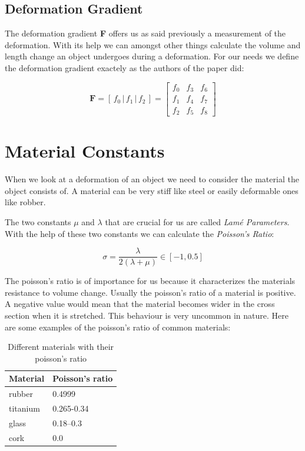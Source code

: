 

\subsection{Deformation Gradient}
The deformation gradient \textbf{F} offers us as said previously a measurement of the deformation. With its help we can amongst other things calculate the volume and length change an object undergoes during a deformation. For our needs we define the deformation gradient exactely as the authors of the paper \cite{Smith:2018:SNF:3191713.3180491} did:

\[
\textbf{F} = \left[ \,f_0\, \bigg| \,f_1\, \bigg| \,f_2\, \right] = \begin{bmatrix} f_0 & f_3 & f_6 \\ f_1 & f_4 & f_7 \\ f_2 & f_5 & f_8 \end{bmatrix}
\]





\section{Material Constants}
When we look at a deformation of an object we need to consider the material the object consists of. A material can be very stiff like steel or easily deformable ones like robber. 

The two constants $\mu$ and $\lambda$ that are crucial for us are called \textit{Lamé Parameters}. With the help of these two constants we can calculate the \textit{Poisson's Ratio}:

\[ \sigma =  \frac{\lambda}{2(\lambda + \mu)} \in [-1, 0.5] \]

The poisson's ratio is of importance for us because it characterizes the materials resistance to volume change. Usually the poisson's ratio of a material is positive. A negative value would mean that the material becomes wider in the cross section when it is stretched. This behaviour is very uncommon in nature. Here are some examples of the poisson's ratio of common materials:

\begin{table}[h!]
\centering
    \begin{tabular}{ | l | l |}
    \hline
    Material & Poisson's ratio \\ \hline
    rubber & 0.4999 \\ \hline
    titanium & 0.265-0.34 \\ \hline
    glass & 0.18–0.3 \\ \hline
    cork & 0.0 \\ \hline
    \end{tabular}
    \caption{Different materials with their poisson's ratio}
\label{table:1}
\end{table}


